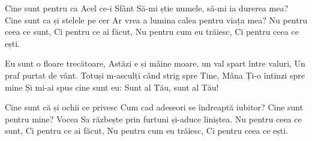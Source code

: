 \beginverse
Cine sunt pentru ca Acel ce-i Sfânt
Să-mi știe numele, să-mi ia durerea mea?
Cine sunt ca și stelele pe cer
Ar vrea a lumina calea pentru viața mea?
Nu pentru ceea ce sunt,
Ci pentru ce ai făcut,
Nu pentru cum eu trăiesc,
Ci pentru ceea ce ești.
\endverse

\beginchorus
Eu sunt o floare trecătoare,
Astăzi e și mâine moare, un val spart între valuri,
Un praf purtat de vânt.
Totuși m-asculți când strig spre Tine,
Mâna Ți-o întinzi spre mine
Și mi-ai spus cine sunt eu:
Sunt al Tău, sunt al Tău!
\endchorus

\beginverse
Cine sunt că și ochii ce privesc
Cum cad adeseori se îndreaptă iubitor?
Cine sunt pentru mine?
Vocea Sa răzbește prin furtuni și-aduce liniștea.
Nu pentru ceea ce sunt,
Ci pentru ce ai făcut,
Nu pentru cum eu trăiesc,
Ci pentru ceea ce ești.
\endverse
\endsong